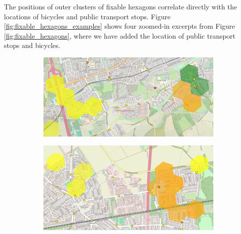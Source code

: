 The positions of outer clusters of fixable hexagons correlate directly with the locations of bicycles and public transport stops.
Figure \ref{fig:fixable_hexagons_examples} shows four zoomed-in excerpts from Figure \ref{fig:fixable_hexagons}, where we have added the location of public transport stops and bicycles.
\begin{figure}
     \centering
     \begin{subfigure}[b]{0.49\textwidth}
         \centering
         \includegraphics[width=\textwidth]{Figures/results/problematic_hexagons/example_1.png}
     \end{subfigure}
     \hfill
     \begin{subfigure}[b]{0.49\textwidth}
         \centering
         \includegraphics[width=\textwidth]{Figures/results/problematic_hexagons/example_2.png}
     \end{subfigure}
     \hfill
     \begin{subfigure}[b]{0.49\textwidth}
         \centering

\end{subfigure}
\end{figure}
